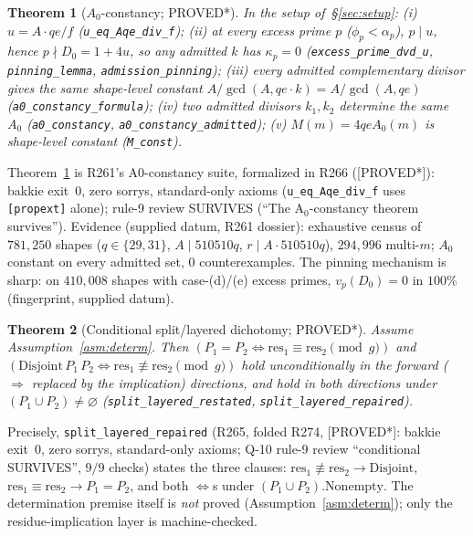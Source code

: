 \documentclass[11pt,a4paper]{article}
\newtheorem{theorem}{Theorem}
\theoremstyle{definition}
\begin{document}
\begin{theorem}[$A_0$-constancy; PROVED*]
  \label{thm:a0}
  In the setup of~\S\ref{sec:setup}: (i) $u=A\cdot qe/f$
  (\texttt{u\_eq\_Aqe\_div\_f}); (ii) at every excess prime $p$
  ($\phi_p<\alpha_p$), $p\mid u$, hence $p\nmid D_0=1+4u$, so any
  admitted $k$ has $\kappa_p=0$ (\texttt{excess\_prime\_dvd\_u},
  \texttt{pinning\_lemma}, \texttt{admission\_pinning}); (iii) every
  admitted complementary divisor gives the same shape-level constant
  $A/\gcd(A,qe\cdot k)=A/\gcd(A,qe)$
  (\texttt{a0\_constancy\_formula}); (iv) two admitted divisors
  $k_1,k_2$ determine the same $A_0$
  (\texttt{a0\_constancy}, \texttt{a0\_constancy\_admitted}); (v)
  $M(m)=4qeA_0(m)$ is shape-level constant (\texttt{M\_const}).
\end{theorem}

Theorem~\ref{thm:a0} is R261's A0-constancy suite, formalized in R266
([PROVED*]): bakkie exit~$0$, zero sorrys, standard-only axioms
(\texttt{u\_eq\_Aqe\_div\_f} uses \texttt{[propext]} alone); rule-9
review SURVIVES (``The A$_0$-constancy theorem survives''). Evidence
(supplied datum, R261 dossier): exhaustive census of $781{,}250$ shapes
($q\in\{29,31\}$, $A\mid510510q$, $r\mid A\cdot510510q$), $294{,}996$
multi-$m$; $A_0$ constant on every admitted set, $0$ counterexamples.
The pinning mechanism is sharp: on $410{,}008$ shapes with case-(d)/(e)
excess primes, $v_p(D_0)=0$ in $100\%$ (fingerprint, supplied datum).

\begin{theorem}[Conditional split/layered dichotomy; PROVED*]
  \label{thm:split}
  Assume Assumption~\ref{asm:determ}. Then
  $(P_1=P_2\iff\mathrm{res}_1\equiv\mathrm{res}_2\pmod g)$ and
  $(\mathrm{Disjoint}\,P_1\,P_2\iff\mathrm{res}_1\not\equiv
  \mathrm{res}_2\pmod g)$ hold unconditionally in the forward
  ($\Rightarrow$ replaced by the implication) directions, and hold in
  both directions under $(P_1\cup P_2)\neq\varnothing$
  (\texttt{split\_layered\_restated}, \texttt{split\_layered\_repaired}).
\end{theorem}

Precisely, \texttt{split\_layered\_repaired} (R265, folded R274,
[PROVED*]: bakkie exit~$0$, zero sorrys, standard-only axioms; Q-10
rule-9 review ``conditional SURVIVES'', $9/9$ checks) states the three
clauses: $\mathrm{res}_1\not\equiv\mathrm{res}_2\to\mathrm{Disjoint}$,
$\mathrm{res}_1\equiv\mathrm{res}_2\to P_1=P_2$, and both $\iff$s under
$(P_1\cup P_2).\mathrm{Nonempty}$. The determination premise itself is
\emph{not} proved (Assumption~\ref{asm:determ}); only the
residue-implication layer is machine-checked.
\end{document}
